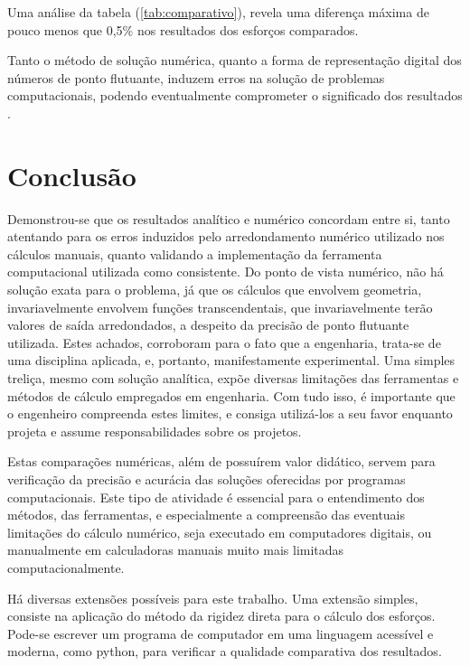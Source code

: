 \documentclass[a4paper, 12pt]{article} %
\begin{document}
Uma análise da tabela (\ref{tab:comparativo}), revela uma diferença máxima de pouco menos que 0,5\% nos resultados dos esforços comparados.

Tanto o método de solução numérica, quanto a forma de representação digital dos números de ponto flutuante, induzem erros na solução de problemas computacionais, podendo eventualmente comprometer o significado dos resultados \cite{Roy1971}. 
 
\section{Conclusão}

Demonstrou-se que os resultados analítico e numérico concordam entre si, tanto atentando para os erros induzidos pelo arredondamento numérico utilizado nos cálculos manuais, quanto validando a implementação da ferramenta computacional utilizada como consistente. Do ponto de vista numérico, não há solução exata para o problema, já que os cálculos que envolvem geometria, invariavelmente envolvem funções transcendentais, que invariavelmente terão valores de saída arredondados, a despeito da precisão de ponto flutuante utilizada. Estes achados, corroboram para o fato que a engenharia, trata-se de uma disciplina aplicada, e, portanto, manifestamente experimental. Uma simples treliça, mesmo com solução analítica, expõe diversas limitações das ferramentas e métodos de cálculo empregados em engenharia. Com tudo isso, é importante que o engenheiro compreenda estes limites, e consiga utilizá-los a seu favor enquanto projeta e assume responsabilidades sobre os projetos. 

Estas comparações numéricas, além de possuírem valor didático, servem para verificação da precisão e acurácia das soluções oferecidas por programas computacionais. Este tipo de atividade é essencial para o entendimento dos métodos, das ferramentas, e especialmente a compreensão das eventuais limitações do cálculo numérico, seja executado em computadores digitais, ou manualmente em calculadoras manuais muito mais limitadas computacionalmente.

Há diversas extensões possíveis para este trabalho. Uma extensão simples, consiste na aplicação do método da rigidez direta para o cálculo dos esforços. Pode-se escrever um programa de computador em uma linguagem acessível e moderna, como python, para verificar a qualidade comparativa dos resultados. 

\printbibliography
\end{document}
